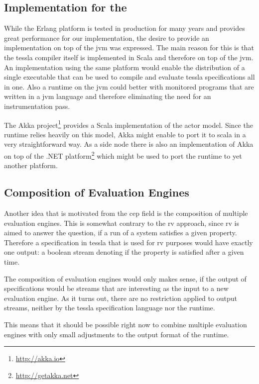 \subsection{Implementation for the }
\label{sec:conclusion:further_work:jvm}

While the Erlang platform is tested in production for many years and provides great performance for our implementation, the desire to provide an implementation on top of the \gls{jvm} was expressed.
The main reason for this is that the \gls{tessla} compiler itself is implemented in Scala and therefore on top of the \gls{jvm}.
An implementation using the same platform would enable the distribution of a single executable that can be used to compile and evaluate \gls{tessla} specifications all in one.
Also a runtime on the \gls{jvm} could better with monitored programs that are written in a \gls{jvm} language and therefore eliminating the need for an instrumentation pass.

The Akka project\footnote{\url{http://akka.io}} provides a Scala implementation of the actor model.
Since the runtime relies heavily on this model, Akka might enable to port it to scala in a very straightforward way.
As a side node there is also an implementation of Akka on top of the .NET platform\footnote{\url{http://getakka.net}} which might be used to port the runtime to yet another platform.

\subsection{Composition of Evaluation Engines}
\label{sec:conclusion:further_work:composition}

Another idea that is motivated from the \gls{cep} field is the composition of multiple evaluation engines.
This is somewhat contrary to the \gls{rv} approach, since \gls{rv} is aimed to answer the question, if a run of a system satisfies a given property.
Therefore a specification in \gls{tessla} that is used for \gls{rv} purposes would have exactly one output: a boolean stream denoting if the property is satisfied after a given time.

The composition of evaluation engines would only makes sense, if the output of specifications would be streams that are interesting as the input to a new evaluation engine.
As it turns out, there are no restriction applied to output streams, neither by the \gls{tessla} specification language nor the runtime.

This means that it should be possible right now to combine multiple evaluation engines with only small adjustments to the output format of the runtime.

